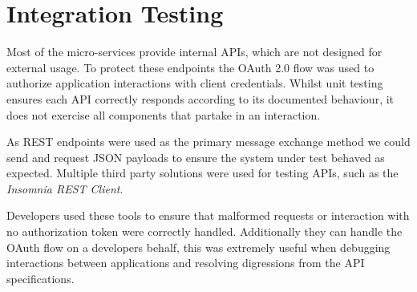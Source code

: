 \section{Integration Testing}
\par
Most of the micro-services provide internal APIs, which are not designed for external usage. To protect these endpoints the OAuth 2.0 flow was used to authorize application interactions with client credentials. Whilst unit testing ensures each API correctly responds according to its documented behaviour, it does not exercise all components that partake in an interaction.

\par
As REST endpoints were used as the primary message exchange method we could send and request JSON payloads to ensure the system under test behaved as expected. Multiple third party solutions were used for testing APIs, such as the \textit{Insomnia REST Client}. 

\par
Developers used these tools to ensure that malformed requests or interaction with no authorization token were correctly handled. Additionally they can handle the OAuth flow on a developers behalf, this was extremely useful when debugging interactions between applications and resolving digressions from the API specifications.
